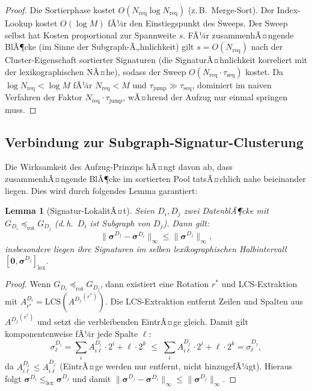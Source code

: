 ﻿\documentclass[a4paper,12pt]{article}
\theoremstyle{definition}
\theoremstyle{plain}
\newtheorem{lemma}{Lemma}[section]
\begin{document}
\begin{proof}
  Die Sortierphase kostet $O(N_{\mathrm{req}} \log N_{\mathrm{req}})$
  (z.\,B.\ Merge-Sort).  Der Index-Lookup kostet $O(\log M)$ fÃ¼r den
  Einstiegspunkt des Sweeps.  Der Sweep selbst hat Kosten proportional
  zur Spannweite $s$.  FÃ¼r zusammenhÃ¤ngende BlÃ¶cke (im Sinne der
  Subgraph-Ã„hnlichkeit) gilt $s = O(N_{\mathrm{req}})$ nach der
  Cluster-Eigenschaft sortierter Signaturen (die SignaturÃ¤hnlichkeit
  korreliert mit der lexikographischen NÃ¤he), sodass der Sweep
  $O(N_{\mathrm{req}} \cdot \tau_{\mathrm{seq}})$ kostet.
  Da $\log N_{\mathrm{req}} < \log M$ fÃ¼r $N_{\mathrm{req}} < M$
  und $\tau_{\mathrm{jump}} \gg \tau_{\mathrm{seq}}$, dominiert im
  naiven Verfahren der Faktor $N_{\mathrm{req}} \cdot \tau_{\mathrm{jump}}$,
  wÃ¤hrend der Aufzug nur einmal springen muss. 
\end{proof}

\subsection{Verbindung zur Subgraph-Signatur-Clusterung}
\label{ssec:elevator_clusterung}

Die Wirksamkeit des Aufzug-Prinzips hÃ¤ngt davon ab, dass zusammenhÃ¤ngende
BlÃ¶cke im sortierten Pool tatsÃ¤chlich nahe beieinander liegen.  Dies wird
durch folgendes Lemma garantiert:

\begin{lemma}[Signatur-LokalitÃ¤t]
\label{lem:sig_lokalitaet}
  Seien $D_i, D_j$ zwei DatenblÃ¶cke mit
  $G_{D_i} \preceq_{\mathrm{rot}} G_{D_j}$
  (d.\,h.\ $D_i$ ist Subgraph von $D_j$).  Dann gilt:
  \[
    \|\boldsymbol{\sigma}^{D_j} - \boldsymbol{\sigma}^{D_i}\|_\infty
    \le \|\boldsymbol{\sigma}^{D_j}\|_\infty,
  \]
  insbesondere liegen ihre Signaturen im selben lexikographischen
  Halbintervall $[\mathbf{0}, \boldsymbol{\sigma}^{D_j}]_{\mathrm{lex}}$.
\end{lemma}

\begin{proof}
  Wenn $G_{D_i} \preceq_{\mathrm{rot}} G_{D_j}$, dann existiert eine
  Rotation $r^*$ und LCS-Extraktion mit
  $A^{D_i}_{r^*} = \mathrm{LCS}({A^{D_j}}^{(r^*)})$.
  Die LCS-Extraktion entfernt Zeilen und Spalten aus ${A^{D_j}}^{(r^*)}$
  und setzt die verbleibenden EintrÃ¤ge gleich.  Damit gilt
  komponentenweise fÃ¼r jede Spalte $\ell$:
  \[
    \sigma_\ell^{D_i} = \sum_i A^{D_i}_{i\ell} \cdot 2^i + \ell \cdot 2^k
    \;\le\;
    \sum_i A^{D_j}_{i\ell} \cdot 2^i + \ell \cdot 2^k
    = \sigma_\ell^{D_j},
  \]
  da $A^{D_i}_{i\ell} \le A^{D_j}_{i\ell}$ (EintrÃ¤ge werden nur entfernt,
  nicht hinzugefÃ¼gt).  Hieraus folgt
  $\boldsymbol{\sigma}^{D_i} \le_{\mathrm{lex}} \boldsymbol{\sigma}^{D_j}$
  und damit
  $\|\boldsymbol{\sigma}^{D_j} - \boldsymbol{\sigma}^{D_i}\|_\infty
  \le \|\boldsymbol{\sigma}^{D_j}\|_\infty$. 
\end{proof}
\end{document}
